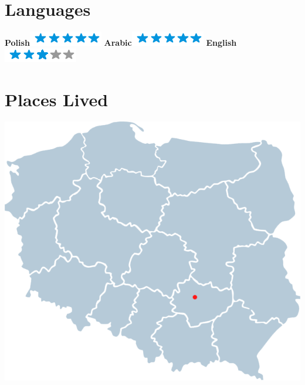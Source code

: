 \documentclass[]{friggeri-cv}
\begin{document}
\begin{aside}
  \section{Languages}
    \textbf{Polish}\includegraphics[scale=0.40]{img/5stars.png}
    \textbf{Arabic}\includegraphics[scale=0.40]{img/5stars.png}
    \textbf{English}\includegraphics[scale=0.40]{img/3stars.png}
    ~
  \section{Places Lived}
    \includegraphics[scale=0.15]{img/pl-1.png}
    ~
\end{aside}

\end{document}
